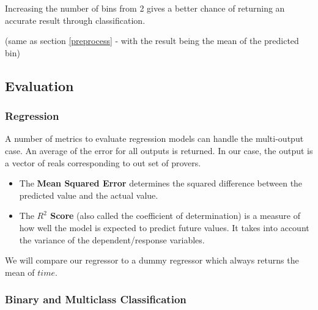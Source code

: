 \documentclass[]{article}
\begin{document}
Increasing the number of bins from 2 gives a better chance of returning an accurate result through classification.

\vspace{0.2in}

\noindent{}
\vspace{0.2in}

(same as section \ref{preprocess} - with the result being the mean of the predicted bin)

\subsection{Evaluation}

\subsubsection{Regression}
\label{eval2}

A number of metrics to evaluate regression models can handle the multi-output case. An average of the error for all outputs is returned. In our case, the output is a vector of reals corresponding to out set of provers. 
\begin{itemize}
\item{The \textbf{Mean Squared Error}  determines the squared difference between the predicted value and the actual value.}
\item{The \textbf{$R^{2}$ Score} (also called the coefficient of determination) is a measure of how well the model is expected to predict future values. It takes into account the variance of the dependent/response variables.}
\end{itemize}

We will compare our regressor to a dummy regressor which always returns the mean of $time$.
 
\subsubsection{Binary and Multiclass Classification}
\end{document}
